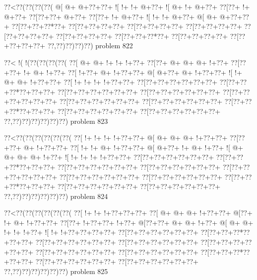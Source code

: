 \vbox{\vbox{\goo
\0??<\0??(\0??(\0??(\0??(
\- @[\- @+\- @+\0??+\0??+
\- ![\- !+\- !+\- @+\0??+
\- ![\- @+\- !+\- @+\0??+
\0??[\0??+\- !+\- @+\0??+
\0??[\0??+\0??+\- @+\0??+
\0??[\0??+\- !+\- @+\0??+
\- ![\- !+\- !+\- @+\0??+
\- @[\- @+\- @+\0??+\0??+
\0??[\0??+\0??+\0??*\0??+
\0??[\0??+\0??+\0??+\0??+
\0??[\0??+\0??+\0??+\0??+
\0??[\0??+\0??+\0??+\0??+
\0??[\0??+\0??+\0??+\0??+
\0??[\0??+\0??+\0??+\0??+
\0??[\0??+\0??+\0??*\0??+
\0??[\0??+\0??+\0??+\0??+
\0??[\0??+\0??+\0??+\0??+
\0??,\0??)\0??)\0??)\0??)
}
\hfil problem 822\hfil\break
}

\vbox{\vbox{\goo
\0??<\- !(\- !(\0??(\0??(\0??(\0??(
\0??[\- @+\- @+\- !+\- !+\- !+\0??+
\0??[\0??+\- @+\- @+\- @+\- !+\0??+
\0??[\0??+\0??+\- !+\- @+\- !+\0??+
\0??[\- !+\0??+\- @+\- !+\0??+\0??+
\- @[\- @+\0??+\- @+\- !+\0??+\0??+
\- ![\- !+\- @+\- @+\- !+\0??+\0??+
\0??[\- !+\- !+\- !+\- !+\0??+\0??+
\0??[\0??+\0??+\0??+\0??+\0??+\0??+
\0??[\0??+\0??+\0??*\0??+\0??+\0??+
\0??[\0??+\0??+\0??+\0??+\0??+\0??+
\0??[\0??+\0??+\0??+\0??+\0??+\0??+
\0??[\0??+\0??+\0??+\0??+\0??+\0??+
\0??[\0??+\0??+\0??+\0??+\0??+\0??+
\0??[\0??+\0??+\0??+\0??+\0??+\0??+
\0??[\0??+\0??+\0??*\0??+\0??+\0??+
\0??[\0??+\0??+\0??+\0??+\0??+\0??+
\0??[\0??+\0??+\0??+\0??+\0??+\0??+
\0??,\0??)\0??)\0??)\0??)\0??)\0??)
}
\hfil problem 823\hfil\break
}

\vbox{\vbox{\goo
\0??<\0??(\0??(\0??(\0??(\0??(\0??(
\0??[\- !+\- !+\- !+\- !+\0??+\0??+
\- @[\- @+\- @+\- @+\- !+\0??+\0??+
\0??[\0??+\0??+\- @+\- !+\0??+\0??+
\0??[\- !+\- !+\- @+\- !+\0??+\0??+
\- @[\- @+\0??+\- !+\- @+\- !+\0??+
\- ![\- @+\- @+\- @+\- @+\- !+\0??+
\- ![\- !+\- !+\- !+\- !+\0??+\0??+
\0??[\0??+\0??+\0??+\0??+\0??+\0??+
\0??[\0??+\0??+\0??*\0??+\0??+\0??+
\0??[\0??+\0??+\0??+\0??+\0??+\0??+
\0??[\0??+\0??+\0??+\0??+\0??+\0??+
\0??[\0??+\0??+\0??+\0??+\0??+\0??+
\0??[\0??+\0??+\0??+\0??+\0??+\0??+
\0??[\0??+\0??+\0??+\0??+\0??+\0??+
\0??[\0??+\0??+\0??*\0??+\0??+\0??+
\0??[\0??+\0??+\0??+\0??+\0??+\0??+
\0??[\0??+\0??+\0??+\0??+\0??+\0??+
\0??,\0??)\0??)\0??)\0??)\0??)\0??)
}
\hfil problem 824\hfil\break
}

\vbox{\vbox{\goo
\0??<\0??(\0??(\0??(\0??(\0??(\0??(
\0??[\- !+\- !+\- !+\0??+\0??+\0??+
\0??[\- @+\- @+\- @+\- !+\0??+\0??+
\- @[\0??+\- !+\- @+\- !+\0??+\0??+
\0??[\0??+\- !+\0??+\0??+\- !+\0??+
\- @[\0??+\0??+\- @+\- @+\- !+\0??+
\- @[\- @+\- @+\- !+\- !+\- !+\0??+
\- ![\- !+\- !+\0??+\0??+\0??+\0??+
\0??[\0??+\0??+\0??+\0??+\0??+\0??+
\0??[\0??+\0??+\0??*\0??+\0??+\0??+
\0??[\0??+\0??+\0??+\0??+\0??+\0??+
\0??[\0??+\0??+\0??+\0??+\0??+\0??+
\0??[\0??+\0??+\0??+\0??+\0??+\0??+
\0??[\0??+\0??+\0??+\0??+\0??+\0??+
\0??[\0??+\0??+\0??+\0??+\0??+\0??+
\0??[\0??+\0??+\0??*\0??+\0??+\0??+
\0??[\0??+\0??+\0??+\0??+\0??+\0??+
\0??[\0??+\0??+\0??+\0??+\0??+\0??+
\0??,\0??)\0??)\0??)\0??)\0??)\0??)
}
\hfil problem 825\hfil\break
}


